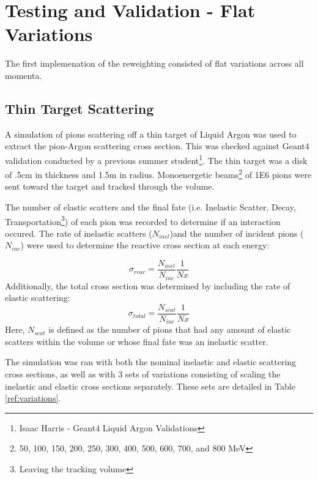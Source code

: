 \documentclass[12pt]{article}
\begin{document}
\section{Testing and Validation - Flat Variations}
The first implemenation of the reweighting consisted of flat variations across all momenta. 


\subsection{Thin Target Scattering}
A simulation of pions scattering off a thin target of Liquid Argon was used to extract the pion-Argon scattering cross section. %
This was checked against Geant4 validation conducted by a previous summer student\footnote{Isaac Harris - Geant4 Liquid Argon Validations}.
The thin target was a disk of .5cm in thickness and 1.5m in radius. Monoenergetic beams\footnote{{50, 100, 150, 200, 250, 300, 400, 500, 600, 700, and 800} MeV } of 1E6 pions were sent toward the target and tracked through the volume. 

The number of elastic scatters and the final fate (i.e. Inelastic Scatter, Decay, Transportation\footnote{Leaving the tracking volume}) of each pion was recorded to determine if an interaction occured. The rate of inelastic scatters ($N_{inel}$)and the number of incident pions ($N_{inc}$) were used to determine the reactive cross section at each energy: 

\begin{equation}\label{ref:reactive_xsec}
\sigma_{reac} = \frac{N_{inel}}{N_{inc}}\frac{1}{Nx}
\end{equation}
Additionally, the total cross section was determined by including the rate of elastic scattering:
\begin{equation}\label{ref:total_xsec}
\sigma_{total} = \frac{N_{scat}}{N_{inc}}\frac{1}{Nx}
\end{equation}
Here, $N_{scat}$ is defined as the number of pions that had any amount of elastic scatters within the volume or whose final fate was an inelastic scatter. 

The simulation was ran with both the nominal inelastic and elastic scattering cross sections, as well as with 3 sets of variations consisting of scaling the inelastic and elastic cross sections separately. These sets are detailed in Table \ref{ref:variations}. 
\end{document}
